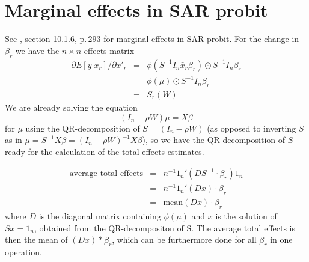 \documentclass[a4paper]{article}
\begin{document}
\section{Marginal effects in SAR probit}

See \cite{LeSage2009}, section 10.1.6, p.\,293 for marginal effects in SAR probit.
For the change in $\beta_r$ we have the $n \times n$ effects matrix
\begin{eqnarray}
 \partial E[y | x_r] / \partial x'_r & = & \phi(S^{-1} I_n \bar{x}_r \beta_r) \odot S^{-1} I_n \beta_r \\
                                     & = & \phi(\mu) \odot S^{-1} I_n \beta_r \nonumber \\
                                     & = & S_r(W) \nonumber  
\end{eqnarray}
We are already solving the equation 
\begin{equation}
  (I_n - \rho W) \mu = X \beta \nonumber
\end{equation}   
for $\mu$ using the QR-decomposition of $S = (I_n - \rho W)$
(as opposed to inverting $S$ as in $\mu = S^{-1} X \beta = (I_n -  \rho W)^{-1} X \beta$),
so we have the QR decomposition of $S$ ready for the calculation of the total effects estimates.

\begin{eqnarray}
\text{average total effects} & = & n^{-1} 1_n' (D S^{-1} \cdot \beta_r) 1_n \\
                             & = & n^{-1} 1_n' (D x) \cdot \beta_r \nonumber \\
                             & = & \text{mean}(D x) \cdot \beta_r \nonumber
\end{eqnarray}
where $D$ is the diagonal matrix containing $\phi(\mu)$ and $x$ is the solution of $S x = 1_n$, obtained from the QR-decompositon
of S. The average total effects is then the mean of $(D x) * \beta_r$, which can be furthermore done for all $\beta_r$ in one operation.



\end{document}
